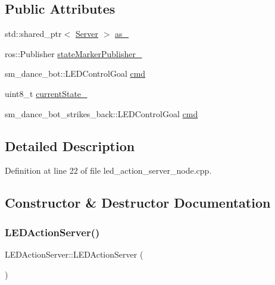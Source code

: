\subsection*{Public Attributes}
\begin{DoxyCompactItemize}
\item 
std\+::shared\+\_\+ptr$<$ \hyperlink{odom__tracker__node_8cpp_a9884574d0480319430f628f79afc0500}{Server} $>$ \hyperlink{classLEDActionServer_a61d21c77642081acf017d4ebd65b2de0}{as\+\_\+}
\item 
ros\+::\+Publisher \hyperlink{classLEDActionServer_a4168a1e4a17eb1d65aaa059ce0c52086}{state\+Marker\+Publisher\+\_\+}
\item 
sm\+\_\+dance\+\_\+bot\+::\+L\+E\+D\+Control\+Goal \hyperlink{classLEDActionServer_a4d3a4c07e7659cdd78228932bb1634d3}{cmd}
\item 
uint8\+\_\+t \hyperlink{classLEDActionServer_a1dc456e987dc331501ad6ff2215661ff}{current\+State\+\_\+}
\item 
sm\+\_\+dance\+\_\+bot\+\_\+strikes\+\_\+back\+::\+L\+E\+D\+Control\+Goal \hyperlink{classLEDActionServer_a219e3a4ae2a09887d601bc9b210294dd}{cmd}
\end{DoxyCompactItemize}


\subsection{Detailed Description}


Definition at line 22 of file led\+\_\+action\+\_\+server\+\_\+node.\+cpp.



\subsection{Constructor \& Destructor Documentation}
\mbox{\label{classLEDActionServer_a6978c43940438b9fd8bfcd6b443092d3}} 
\subsubsection{\texorpdfstring{L\+E\+D\+Action\+Server()}{LEDActionServer()}\hspace{0.1cm}{\footnotesize\ttfamily [1/2]}}
{\footnotesize\ttfamily L\+E\+D\+Action\+Server\+::\+L\+E\+D\+Action\+Server (\begin{DoxyParamCaption}{ }\end{DoxyParamCaption})\hspace{0.3cm}{\ttfamily [inline]}}

